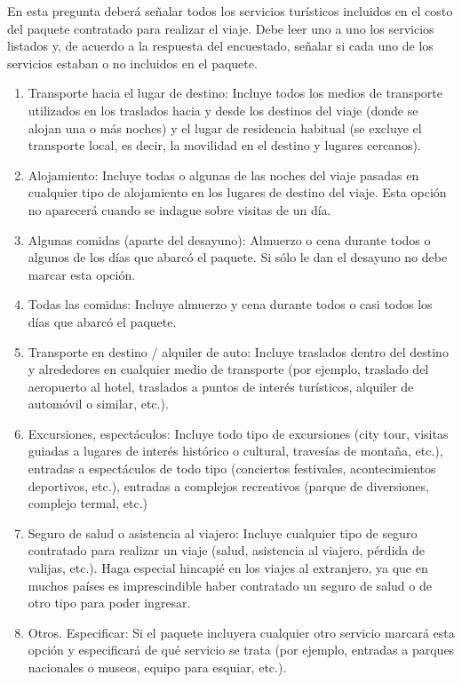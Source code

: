 \documentclass[
  openany]{book}
\providecommand{\tightlist}{%
  \setlength{\itemsep}{0pt}\setlength{\parskip}{0pt}}
\begin{document}
En esta pregunta deberá señalar todos los servicios turísticos incluidos en el costo del paquete contratado para realizar el viaje. Debe leer uno a uno los servicios listados y, de acuerdo a la respuesta del encuestado, señalar si cada uno de los servicios estaban o no incluidos en el paquete.

\begin{enumerate}
\def\labelenumi{\arabic{enumi}.}
\tightlist
\item
  Transporte hacia el lugar de destino: Incluye todos los medios de transporte utilizados en los traslados hacia y desde los destinos del viaje (donde se alojan una o más noches) y el lugar de residencia habitual (se excluye el transporte local, es decir, la movilidad en el destino y lugares cercanos).
\item
  Alojamiento: Incluye todas o algunas de las noches del viaje pasadas en cualquier tipo de alojamiento en los lugares de destino del viaje. Esta opción no aparecerá cuando se indague sobre visitas de un día.
\item
  Algunas comidas (aparte del desayuno): Almuerzo o cena durante todos o algunos de los días que abarcó el paquete. Si sólo le dan el desayuno no debe marcar esta opción.
\item
  Todas las comidas: Incluye almuerzo y cena durante todos o casi todos los días que abarcó el paquete.
\item
  Transporte en destino / alquiler de auto: Incluye traslados dentro del destino y alrededores en cualquier medio de transporte (por ejemplo, traslado del aeropuerto al hotel, traslados a puntos de interés turísticos, alquiler de automóvil o similar, etc.).
\item
  Excursiones, espectáculos: Incluye todo tipo de excursiones (city tour, visitas guiadas a lugares de interés histórico o cultural, travesías de montaña, etc.), entradas a espectáculos de todo tipo (conciertos festivales, acontecimientos deportivos, etc.), entradas a complejos recreativos (parque de diversiones, complejo termal, etc.)
\item
  Seguro de salud o asistencia al viajero: Incluye cualquier tipo de seguro contratado para realizar un viaje (salud, asistencia al viajero, pérdida de valijas, etc.). Haga especial hincapié en los viajes al extranjero, ya que en muchos países es imprescindible haber contratado un seguro de salud o de otro tipo para poder ingresar.
\item
  Otros. Especificar: Si el paquete incluyera cualquier otro servicio marcará esta opción y especificará de qué servicio se trata (por ejemplo, entradas a parques nacionales o museos, equipo para esquiar, etc.).
\end{enumerate}
\end{document}
